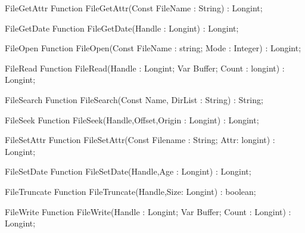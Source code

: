  
\begin{function}{FileGetAttr}
\Declaration
Function FileGetAttr(Const FileName : String) : Longint;
\Description
\Errors
\SeeAlso
\end{function}

 
\begin{function}{FileGetDate}
\Declaration
Function FileGetDate(Handle : Longint) : Longint;
\Description
\Errors
\SeeAlso
\end{function}

 
\begin{function}{FileOpen}
\Declaration
Function FileOpen(Const FileName : string; Mode : Integer) : Longint;
\Description
\Errors
\SeeAlso
\end{function}

 
\begin{function}{FileRead}
\Declaration
Function FileRead(Handle : Longint; Var Buffer; Count : longint) : Longint;
\Description
\Errors
\SeeAlso
\end{function}

 
\begin{function}{FileSearch}
\Declaration
Function FileSearch(Const Name, DirList : String) : String;
\Description
\Errors
\SeeAlso
\end{function}

 
\begin{function}{FileSeek}
\Declaration
Function FileSeek(Handle,Offset,Origin : Longint) : Longint;
\Description
\Errors
\SeeAlso
\end{function}

 
\begin{function}{FileSetAttr}
\Declaration
Function FileSetAttr(Const Filename : String; Attr: longint) : Longint;
\Description
\Errors
\SeeAlso
\end{function}

 
\begin{function}{FileSetDate}
\Declaration
Function FileSetDate(Handle,Age : Longint) : Longint;
\Description
\Errors
\SeeAlso
\end{function}

 
\begin{function}{FileTruncate}
\Declaration
Function FileTruncate(Handle,Size: Longint) : boolean;
\Description
\Errors
\SeeAlso
\end{function}

 
\begin{function}{FileWrite}
\Declaration
Function FileWrite(Handle : Longint; Var Buffer; Count : Longint) : Longint;
\Description
\Errors
\SeeAlso
\end{function}

